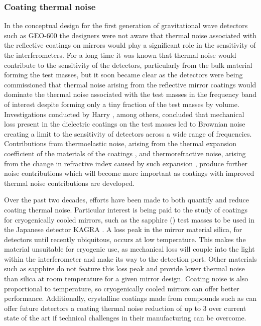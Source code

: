 \subsubsection{\label{sec:coating-thermal-noise}Coating thermal noise}
In the conceptual design for the first generation of gravitational wave detectors such as GEO-600 \cite{Willke2002} the designers were not aware that thermal noise associated with the reflective coatings on mirrors would play a significant role in the sensitivity of the interferometers. For a long time it was known that thermal noise would contribute to the sensitivity of the detectors, particularly from the bulk material forming the test masses, but it soon became clear as the detectors were being commissioned that thermal noise arising from the reflective mirror coatings would dominate the thermal noise associated with the test masses in the frequency band of interest despite forming only a tiny fraction of the test masses by volume. Investigations conducted by Harry \etal{} \cite{Harry2002, Harry2007}, among others, concluded that mechanical loss present in the dielectric coatings on the test masses led to Brownian noise creating a limit to the sensitivity of detectors across a wide range of frequencies. Contributions from thermoelastic noise, arising from the thermal expansion coefficient of the materials of the coatings \cite{Braginsky1999a}, and thermorefractive noise, arising from the change in refractive index caused by such expansion \cite{Braginsky2000a}, produce further noise contributions which will become more important as coatings with improved thermal noise contributions are developed.

Over the past two decades, efforts have been made to both quantify and reduce coating thermal noise. Particular interest is being paid to the study of coatings for cryogenically cooled mirrors, such as the sapphire () test masses to be used in the Japanese detector \gls{KAGRA} \cite{Somiya2012}. A loss peak in the mirror material silica, for detectors until recently ubiquitous, occurs at low temperature. This makes the material unsuitable for cryogenic use, as mechanical loss will couple into the light within the interferometer and make its way to the detection port. Other materials such as sapphire do not feature this loss peak and provide lower thermal noise than silica at room temperature for a given mirror design. Coating noise is also proportional to temperature, so cryogenically cooled mirrors can offer better performance. Additionally, crystalline coatings made from compounds such as  can offer future detectors a coating thermal noise reduction of up to 3 over current state of the art \cite{Cole2013} if technical challenges in their manufacturing can be overcome.

